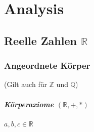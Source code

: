 \chapter{Analysis}

\section[Reelle Zahlen]{Reelle Zahlen $\boldsymbol{\mathbb{R}}$}

\subsection{Angeordnete Körper}

(Gilt auch für $\mathbb{Z}$ und $\mathbb{Q}$)

\paragraph{Körperaxiome $\mathbf{(\mathbb{R}, +, *)}$}
$a,b,c \in \mathbb{R}$

